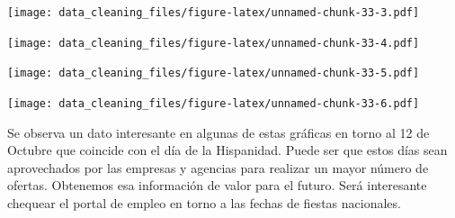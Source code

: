 \documentclass[
]{article}
\newenvironment{Shaded}{\begin{snugshade}}{\end{snugshade}}
\newcommand{\KeywordTok}[1]{\textcolor[rgb]{0.94,0.87,0.69}{#1}}
\newcommand{\NormalTok}[1]{\textcolor[rgb]{0.80,0.80,0.80}{#1}}
\newcommand{\OperatorTok}[1]{\textcolor[rgb]{0.94,0.94,0.82}{#1}}
\newcommand{\StringTok}[1]{\textcolor[rgb]{0.80,0.58,0.58}{#1}}
\begin{document}
\begin{Shaded}
\end{Shaded}

\texttt{[image: data\_cleaning\_files/figure-latex/unnamed-chunk-33-3.pdf]}

\begin{Shaded}
\end{Shaded}

\texttt{[image: data\_cleaning\_files/figure-latex/unnamed-chunk-33-4.pdf]}

\begin{Shaded}
\end{Shaded}

\texttt{[image: data\_cleaning\_files/figure-latex/unnamed-chunk-33-5.pdf]}

\begin{Shaded}
\end{Shaded}

\texttt{[image: data\_cleaning\_files/figure-latex/unnamed-chunk-33-6.pdf]}

Se observa un dato interesante en algunas de estas gráficas en torno al
12 de Octubre que coincide con el día de la Hispanidad. Puede ser que
estos días sean aprovechados por las empresas y agencias para realizar
un mayor número de ofertas. Obtenemos esa información de valor para el
futuro. Será interesante chequear el portal de empleo en torno a las
fechas de fiestas nacionales.
\end{document}
